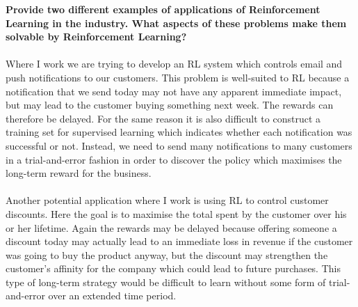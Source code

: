 \documentclass[a4paper,11pt]{article}
\numberwithin{equation}{section}
\theoremstyle{remark}
\begin{document}
\textbf{Provide two different examples of applications of Reinforcement Learning in the industry. What aspects of these problems make them solvable by Reinforcement Learning?}
\\ \\
Where I work we are trying to develop an RL system which controls email and push notifications to our customers. This problem is well-suited to RL because a notification that we send today may not have any apparent immediate impact, but may lead to the customer buying something next week. The rewards can therefore be delayed. For the same reason it is also difficult to construct a training set for supervised learning which indicates whether each notification was successful or not. Instead, we need to send many notifications to many customers in a trial-and-error fashion in order to discover the policy which maximises the long-term reward for the business. 
\\ \\
Another potential application where I work is using RL to control customer discounts. Here the goal is to maximise the total spent by the customer over his or her lifetime. Again the rewards may be delayed because offering someone a discount today may actually lead to an immediate loss in revenue if the customer was going to buy the product anyway, but the discount may strengthen the customer's affinity for the company which could lead to future purchases. This type of long-term strategy would be difficult to learn without some form of trial-and-error over an extended time period. 
\end{document}
